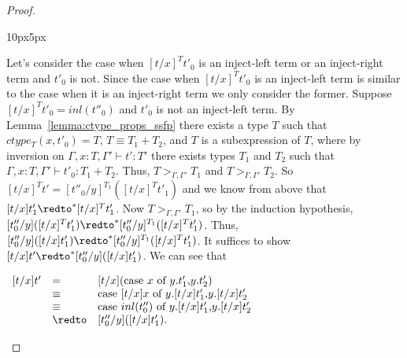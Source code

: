 \begin{proof}
\begin{changemargin}{10px}{5px}
\begin{itemize}
    Let's consider the case when $[t/x]^T t'_0$ is an inject-left term or an inject-right term and 
    $t'_0$ is not.  Since the case when $[t/x]^T t'_0$ is an inject-left term is similar to the case when
    it is an inject-right term we only consider the former.  Suppose $[t/x]^T t'_0 = inl(t''_0)$ and 
    $t'_0$ is not an inject-left term.  By Lemma~\ref{lemma:ctype_props_ssfp} there exists a type
    $T$ such that $ctype_T(x,t'_0) = T$, $T \equiv T_1+T_2$, and $T$ is a subexpression
    of $T$, where by inversion on $\Gamma,x:T,\Gamma' \vdash t':T'$ there exists types $T_1$ and
    $T_2$ such that $\Gamma,x:T,\Gamma' \vdash t'_0:T_1+T_2$.  Thus, $T >_{\Gamma,\Gamma'} T_1$
    and $T >_{\Gamma,\Gamma'} T_2$.  So $[t/x]^T t' = [t''_0/y]^{T_1} ([t/x]^{T} t'_1)$ and we know from above
    that $[t/x]t'_1 \redto^* [t/x]^{T} t'_1$.  Now $T >_{\Gamma,\Gamma'} T_1$, so by the induction
    hypothesis, $[t''_0/y]([t/x]^{T} t'_1) \redto^* [t''_0/y]^{T_1}([t/x]^T t'_1)$.  Thus,
    $[t''_0/y]([t/x] t'_1) \redto^* [t''_0/y]^{T_1}([t/x]^T t'_1)$.  It suffices to show 
    $ [t/x]t' \redto^* [t''_0/y]([t/x] t'_1)$.  We can see that 
    \begin{center}
      \begin{math}
        \begin{array}{lll}
          [t/x]t' & = & [t/x](\ccon{x}{y}{t'_1}{t'_2})\\
          & \equiv & \ccon{[t/x]x}{y}{[t/x]t'_1}{[t/x]t'_2}\\
          & \equiv & \ccon{inl(t''_0)}{y}{[t/x]t'_1}{[t/x]t'_2}\\
          & \redto & [t''_0/y]([t/x]t'_1).
        \end{array}
      \end{math}
    \end{center}


\end{itemize}
\end{changemargin}
\end{proof}
